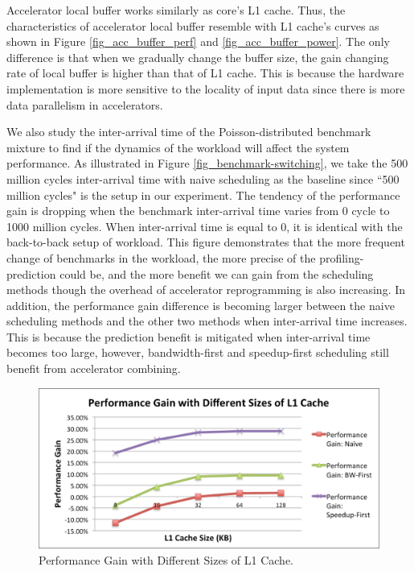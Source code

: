 Accelerator local buffer works similarly as core's L1 cache. Thus, the characteristics of accelerator local buffer resemble with L1 cache's curves as shown in Figure \ref{fig_acc_buffer_perf} and \ref{fig_acc_buffer_power}. The only difference is that when we gradually change the buffer size, the gain changing rate of local buffer is higher than that of L1 cache. This is because the hardware implementation is more sensitive to the locality of input data since there is more data parallelism in accelerators. 

We also study the inter-arrival time of the Poisson-distributed benchmark mixture to find if the dynamics of the workload will affect the system performance. As illustrated in Figure \ref{fig_benchmark-switching}, we take the 500 million cycles inter-arrival time with naive scheduling as the baseline since ``500 million cycles" is the setup in our experiment. The tendency of the performance gain is dropping when the benchmark inter-arrival time varies from 0 cycle to 1000 million cycles. When inter-arrival time is equal to 0, it is identical with the back-to-back setup of workload. This figure demonstrates that the more frequent change of benchmarks in the workload, the more precise of the profiling-prediction could be, and the more benefit we can gain from the scheduling methods though the overhead of accelerator reprogramming is also increasing. In addition, the performance gain difference is becoming larger between the naive scheduling methods and the other two methods when inter-arrival time increases. This is because the prediction benefit is mitigated when inter-arrival time becomes too large, however, bandwidth-first and speedup-first scheduling still benefit from accelerator combining. 

\begin{figure}
    \centering
    \includegraphics[width=4.5in]{L1-Cache-Performance}
    \caption{Performance Gain with Different Sizes of L1 Cache.}
    \label{fig_l1_perf}
\end{figure}

